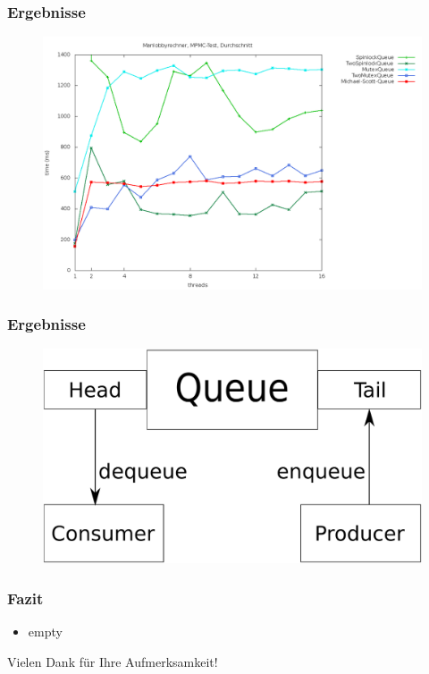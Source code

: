\documentclass[svgnames]{beamer}
\begin{document}

\begin{frame}
\frametitle{Ergebnisse}


\begin {figure}
      \begin{center}
	\includegraphics[width=\textwidth]{manma.png}
     \end{center}
\end {figure}
\end{frame}

\begin{frame}
\frametitle{Ergebnisse}


\begin {figure}
      \begin{center}
	\includegraphics[width=\textwidth /2]{mpmc.pdf}
     \end{center}
\end {figure}
\end{frame}



\begin{frame}
\frametitle{Fazit}
\begin{itemize}
\item empty
\end{itemize}
\end{frame}


\begin{frame}
\Large{\centerline{Vielen Dank f\"ur Ihre Aufmerksamkeit!}}
\end{frame}
\end{document}
